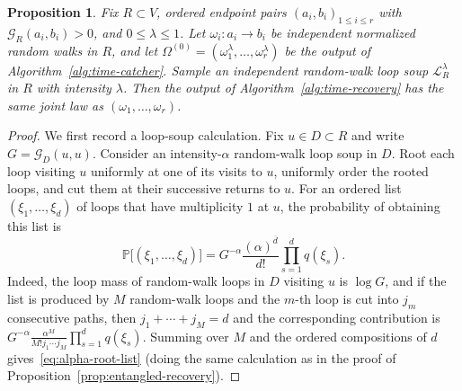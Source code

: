 \documentclass[11pt]{article}
\numberwithin{equation}{section}
\newcommand{\1}{\mathbf{1}}
\newtheorem{proposition}[theorem]{Proposition}
\newcommand{\Prob}{\mathbb P}
\newcommand{\Lc}{\mathcal L}
\newcommand{\Gc}{\mathcal G}
\begin{document}
\begin{proposition}\label{prop:path-recovery}
Fix $R\subset V$, ordered endpoint pairs $(a_i,b_i)_{1\le i\le r}$ with
$\Gc_R(a_i,b_i)>0$, and $0\le\lambda\le 1$. Let
$\omega_i:a_i\to b_i$ be independent normalized random walks in $R$, and let $\Omega^{(0)}
 =(\omega_1^\lambda,\ldots,\omega_r^\lambda)$ be the output of Algorithm~\ref{alg:time-catcher}. Sample an independent random-walk loop soup $\Lc_R^\lambda$ in $R$ with intensity $\lambda$. Then the output of Algorithm~\ref{alg:time-recovery} has
the same joint law as $(\omega_1,\ldots,\omega_r)$.
\end{proposition}
\begin{proof}
We first record a loop-soup calculation.  Fix $u\in D\subset R$ and write $G=\Gc_D(u,u)$.
Consider an intensity-$\alpha$ random-walk loop soup in $D$.  Root each
loop visiting $u$ uniformly at one of its visits to $u$, uniformly order
the rooted loops, and cut them at their successive returns to $u$.  For
an ordered list $(\xi_1,\ldots,\xi_d)$ of loops that have multiplicity $1$ at $u$, the probability of obtaining this list is
\begin{equation}\label{eq:alpha-root-list}
 \Prob\bigl[(\xi_1,\ldots,\xi_d)\bigr]
 =
 G^{-\alpha}\frac{(\alpha)^{\overline d}}{d!}
 \prod_{s=1}^d q(\xi_s).
\end{equation}
Indeed, the loop mass of random-walk loops in $D$ visiting $u$ is $\log G$, and if
the list is produced by $M$ random-walk loops and the $m$-th loop is cut into
$j_m$ consecutive paths, then $j_1+\cdots+j_M=d$
and the corresponding contribution is $ G^{-\alpha}
 \frac{\alpha^M}{M!j_1\cdots j_M}
 \prod_{s=1}^d q(\xi_s)$.
Summing over $M$ and the ordered compositions of $d$ gives~\eqref{eq:alpha-root-list} (doing the same calculation as in the proof of Proposition~\ref{prop:entangled-recovery}).


\end{proof}
\end{document}
